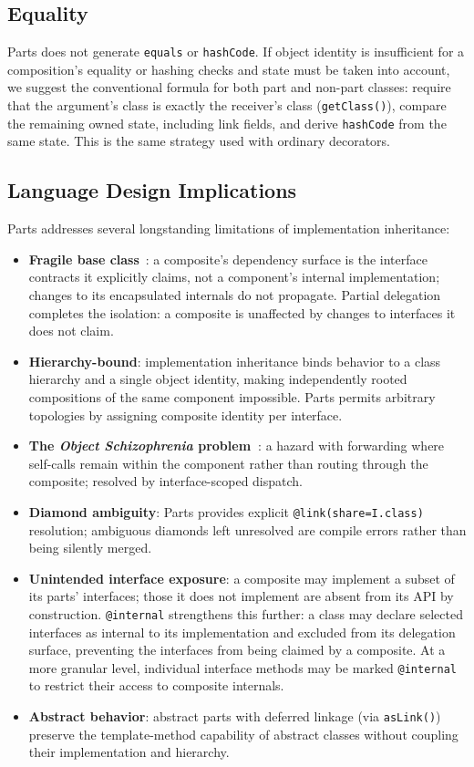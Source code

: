 \documentclass[acmsmall,screen,review,anonymous]{acmart}
\theoremstyle{acmplain}
\newcommand{\code}[1]{\texttt{#1}}
\begin{document}
\subsection{Equality}
Parts does not generate \code{equals} or \code{hashCode}. If object identity is insufficient for a composition's equality
or hashing checks and state must be taken into account, we suggest the conventional formula for both part and non-part classes:
require that the argument's class is exactly the receiver's class (\code{getClass()}), compare the remaining owned state,
including link fields, and derive \code{hashCode} from the same state. This is the same strategy used with ordinary decorators.

\subsection{Language Design Implications}

Parts addresses several longstanding limitations of implementation inheritance:

\begin{itemize}
  \item \textbf{Fragile base class}~\cite{mikhajlov1998}: a composite's dependency surface is the interface contracts it
        explicitly claims, not a component's internal implementation; changes to its encapsulated internals do not propagate.
        Partial delegation completes the isolation: a composite is unaffected by changes to interfaces it does not claim.
  \item \textbf{Hierarchy-bound}: implementation inheritance binds behavior to a class hierarchy and a single object identity,
        making independently rooted compositions of the same component impossible. Parts permits arbitrary topologies by
        assigning composite identity per interface.
  \item \textbf{The \emph{Object Schizophrenia} problem~\cite{sekharaiah2002}}: a hazard with forwarding where self-calls
        remain within the component rather than routing through the composite; resolved by interface-scoped dispatch.
  \item \textbf{Diamond ambiguity}: Parts provides explicit \code{@link(share=I.class)} resolution; ambiguous diamonds left
        unresolved are compile errors rather than being silently merged.
  \item \textbf{Unintended interface exposure}: a composite may implement a subset of its parts' interfaces; those it does
        not implement are absent from its API by construction. \code{@internal} strengthens this further: a class may declare selected
        interfaces as internal to its implementation and excluded from its delegation surface, preventing the
        interfaces from being claimed by a composite. At a more granular level, individual interface methods may be marked
        \code{@internal} to restrict their access to composite internals.
  \item \textbf{Abstract behavior}: abstract parts with deferred linkage (via \code{asLink()}) preserve the template-method
        capability of abstract classes without coupling their implementation and hierarchy.
\end{itemize}
\end{document}
